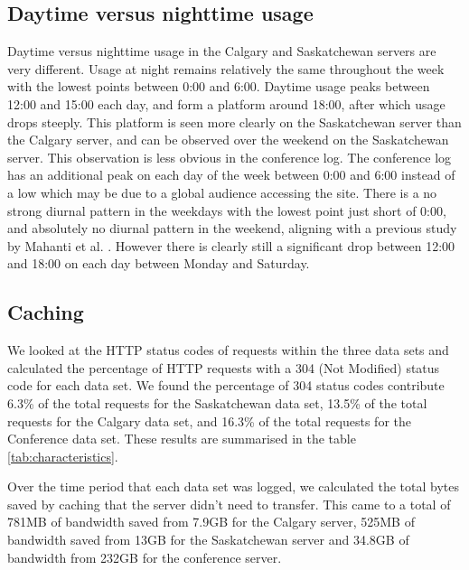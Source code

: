 \documentclass[10pt,conference]{IEEEtran}
\begin{document}
\subsection{Daytime versus nighttime usage} %
\label{sub:daytime_versus_nighttime_usage}
Daytime versus nighttime usage in the Calgary and Saskatchewan servers are very different. Usage at night remains relatively the same throughout the week with the lowest points between 0:00 and 6:00. Daytime usage peaks between 12:00 and 15:00 each day, and form a platform around 18:00, after which usage drops steeply. This platform is seen more clearly on the Saskatchewan server than the Calgary server, and can be observed over the weekend on the Saskatchewan server. This observation is less obvious in the conference log. The conference log has an additional peak on each day of the week between 0:00 and 6:00 instead of a low which may be due to a global audience accessing the site. There is a no strong diurnal pattern in the weekdays with the lowest point just short of 0:00, and absolutely no diurnal pattern in the weekend, aligning with a previous study by Mahanti et al. \cite{Mahanti_Wu}. However there is clearly still a significant drop between 12:00 and 18:00 on each day between Monday and Saturday. 

\subsection{Caching} %
\label{sub:caching}
We looked at the HTTP status codes of requests within the three data sets and calculated the percentage of HTTP requests with a 304 (Not Modified) status code for each data set. We found the percentage of 304 status codes contribute 6.3\% of the total requests for the Saskatchewan data set, 13.5\% of the total requests for the Calgary data set, and 16.3\% of the total requests for the Conference data set. These results are summarised in the table \ref{tab:characteristics}.

Over the time period that each data set was logged, we calculated the total bytes saved by caching that the server didn’t need to transfer. This came to a total of 781MB of bandwidth saved from 7.9GB for the Calgary server, 525MB of bandwidth saved from 13GB for the Saskatchewan server and 34.8GB of bandwidth from 232GB for the conference server.
\end{document}
